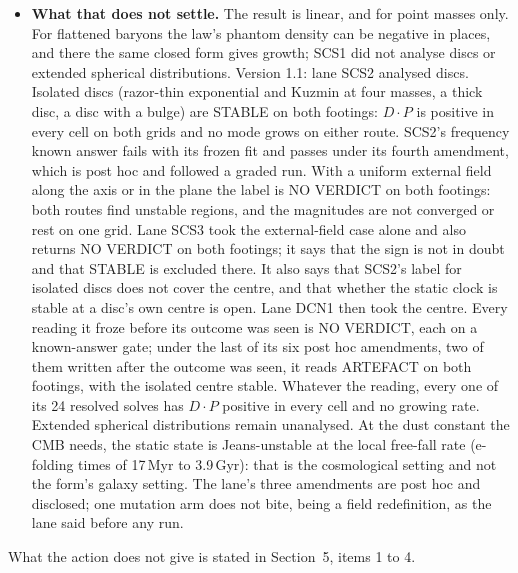 \documentclass[10pt]{article}
\begin{document}
\begin{itemize}
\item \textbf{What that does not settle.} The result is linear, and for point masses only. For flattened baryons the law's phantom density can be negative in places, and there the same closed form gives growth; SCS1 did not analyse discs or extended spherical distributions. Version 1.1: lane SCS2 analysed discs. Isolated discs (razor-thin exponential and Kuzmin at four masses, a thick disc, a disc with a bulge) are STABLE on both footings: $D\!\cdot\!P$ is positive in every cell on both grids and no mode grows on either route. SCS2's frequency known answer fails with its frozen fit and passes under its fourth amendment, which is post hoc and followed a graded run. With a uniform external field along the axis or in the plane the label is NO VERDICT on both footings: both routes find unstable regions, and the magnitudes are not converged or rest on one grid. Lane SCS3 took the external-field case alone and also returns NO VERDICT on both footings; it says that the sign is not in doubt and that STABLE is excluded there. It also says that SCS2's label for isolated discs does not cover the centre, and that whether the static clock is stable at a disc's own centre is open. Lane DCN1 then took the centre. Every reading it froze before its outcome was seen is NO VERDICT, each on a known-answer gate; under the last of its six post hoc amendments, two of them written after the outcome was seen, it reads ARTEFACT on both footings, with the isolated centre stable. Whatever the reading, every one of its 24 resolved solves has $D\!\cdot\!P$ positive in every cell and no growing rate. Extended spherical distributions remain unanalysed. At the dust constant the CMB needs, the static state is Jeans-unstable at the local free-fall rate (e-folding times of 17\,Myr to 3.9\,Gyr): that is the cosmological setting and not the form's galaxy setting. The lane's three amendments are post hoc and disclosed; one mutation arm does not bite, being a field redefinition, as the lane said before any run.
\end{itemize}
What the action does not give is stated in Section~5, items 1 to 4.
\end{document}
